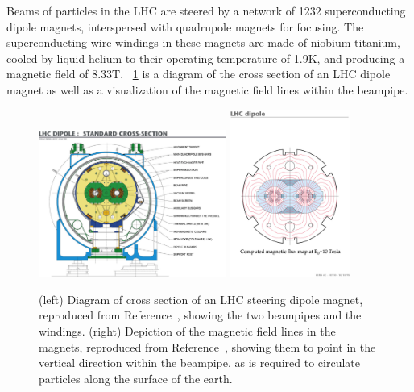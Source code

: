 Beams of particles in the LHC are steered by a network of 1232 superconducting dipole magnets, interspersed with quadrupole magnets for focusing.
The superconducting wire windings in these magnets are made of niobium-titanium, cooled by liquid helium to their operating temperature of 1.9\unit{K}, and producing a magnetic field of 8.33\unit{T}.
\Fig~\ref{cms:dipole} is a diagram of the cross section of an LHC dipole magnet as well as a visualization of the magnetic field lines within the beampipe.

\begin{figure}[p]
  \centering
  \includegraphics[width=0.55\textwidth]{figures/cms/DipoleCrossSection.jpeg}
  \includegraphics[width=0.35\textwidth]{figures/cms/FieldLines.jpg}
  \caption[Diagram of cross section of an LHC steering dipole magnet and depiction of the magnetic field lines in the magnets.]{(left) Diagram of cross section of an LHC steering dipole magnet, reproduced from Reference~\cite{Team:40524}, showing the two beampipes and the windings. (right) Depiction of the magnetic field lines in the magnets, reproduced from Reference~\cite{Jean-Luc:841503}, showing them to point in the vertical direction within the beampipe, as is required to circulate particles along the surface of the earth.}
  \label{cms:dipole}
\end{figure}

